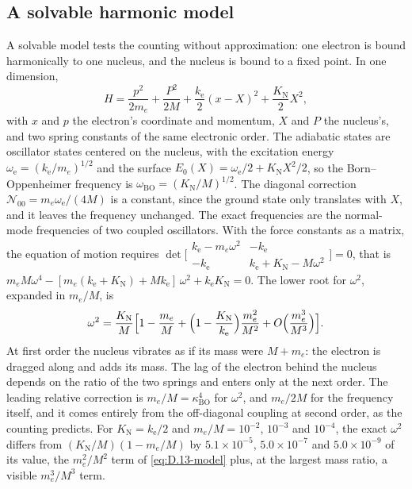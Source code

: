 \subsection*{A solvable harmonic model}

A solvable model tests the counting without approximation: one electron is bound harmonically to one nucleus, and the nucleus is bound to a fixed point. In one dimension,
\begin{equation*}
  H = \frac{p^2}{2m_e} + \frac{P^2}{2M} + \frac{k_{\mathrm{e}}}{2}(x - X)^2 + \frac{K_{\mathrm{N}}}{2}X^2 ,
\end{equation*}
with $x$ and $p$ the electron's coordinate and momentum, $X$ and $P$ the nucleus's, and two spring constants of the same electronic order. The adiabatic states are oscillator states centered on the nucleus, with the excitation energy $\omega_{\mathrm{e}} = (k_{\mathrm{e}}/m_e)^{1/2}$ and the surface $E_0(X) = \omega_{\mathrm{e}}/2 + K_{\mathrm{N}}X^2/2$, so the Born--Oppenheimer frequency is $\omega_{\mathrm{BO}} = (K_{\mathrm{N}}/M)^{1/2}$. The diagonal correction $\mathcal{N}_{00} = m_e\omega_{\mathrm{e}}/(4M)$ is a constant, since the ground state only translates with $X$, and it leaves the frequency unchanged. The exact frequencies are the normal-mode frequencies of two coupled oscillators. With the force constants as a matrix, the equation of motion requires $\det\bigl[\begin{smallmatrix}k_{\mathrm{e}} - m_e\omega^2 & -k_{\mathrm{e}}\\ -k_{\mathrm{e}} & k_{\mathrm{e}} + K_{\mathrm{N}} - M\omega^2\end{smallmatrix}\bigr] = 0$, that is $m_eM\omega^4 - [m_e(k_{\mathrm{e}} + K_{\mathrm{N}}) + Mk_{\mathrm{e}}]\,\omega^2 + k_{\mathrm{e}}K_{\mathrm{N}} = 0$. The lower root for $\omega^2$, expanded in $m_e/M$, is
\begin{equation}
  \omega^2 = \frac{K_{\mathrm{N}}}{M}\Bigl[1 - \frac{m_e}{M} + \Bigl(1 - \frac{K_{\mathrm{N}}}{k_{\mathrm{e}}}\Bigr)\frac{m_e^2}{M^2} + O\Bigl(\frac{m_e^3}{M^3}\Bigr)\Bigr] .
  \label{eq:D.13-model}
\end{equation}
At first order the nucleus vibrates as if its mass were $M + m_e$: the electron is dragged along and adds its mass. The lag of the electron behind the nucleus depends on the ratio of the two springs and enters only at the next order. The leading relative correction is $m_e/M = \kappa_{\mathrm{BO}}^4$ for $\omega^2$, and $m_e/2M$ for the frequency itself, and it comes entirely from the off-diagonal coupling at second order, as the counting predicts. For $K_{\mathrm{N}} = k_{\mathrm{e}}/2$ and $m_e/M = 10^{-2}$, $10^{-3}$ and $10^{-4}$, the exact $\omega^2$ differs from $(K_{\mathrm{N}}/M)(1 - m_e/M)$ by $5.1\times10^{-5}$, $5.0\times10^{-7}$ and $5.0\times10^{-9}$ of its value, the $m_e^2/M^2$ term of \cref{eq:D.13-model} plus, at the largest mass ratio, a visible $m_e^3/M^3$ term.
